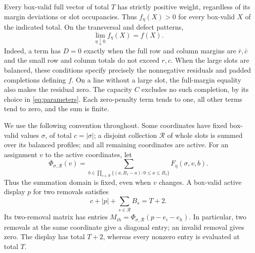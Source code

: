 Every box-valid full vector of total $T$ has strictly positive weight,
regardless of its margin deviations or slot occupancies.  Thus
$f_\eta(X)>0$ for every box-valid $X$ of the indicated total.  On the
transversal and defect patterns,
\begin{equation}\label{eq:soft-limit}
 \lim_{\eta\downarrow0}f_\eta(X)=f(X).
\end{equation}
Indeed, a term has $D=0$ exactly when the full row and column margins are
$\bar r,\bar c$ and the small row and column totals do not exceed $r,c$.
When the large slots are balanced, these conditions specify precisely the
nonnegative residuals and padded completions defining $f$.  On a line
without a large slot, the full-margin equality also makes the residual
zero.  The capacity $C$ excludes no such completion, by its choice in
\eqref{eq:parameters}.  Each zero-penalty term tends to one, all other
terms tend to zero, and the sum is finite.

We use the following convention throughout.  Some coordinates have fixed
box-valid values $\sigma$, of total $c=|\sigma|$; a disjoint collection
$\mathcal R$ of whole slots is summed over its balanced profiles; and all
remaining coordinates are active.  For an assignment $v$ to the active
coordinates, let
\[
 \Phi_{\sigma,\mathcal R}(v)
   =\sum_{b\in\prod_{s\in\mathcal R}
                  \{(a,B_s-a):0\le a\le B_s\}}
        F_\eta(\sigma,v,b).
\]
Thus the summation domain is fixed, even when $v$ changes.
A box-valid active display $p$ for two removals satisfies
\begin{equation}\label{eq:two-removal-total}
 c+|p|+\sum_{s\in\mathcal R}B_s=T+2.
\end{equation}
Its two-removal matrix has entries
$M_{ih}=\Phi_{\sigma,\mathcal R}(p-e_i-e_h)$.
In particular, two removals at the same coordinate give a diagonal entry;
an invalid removal gives zero.  The display has total $T+2$, whereas
every nonzero entry is evaluated at total $T$.

